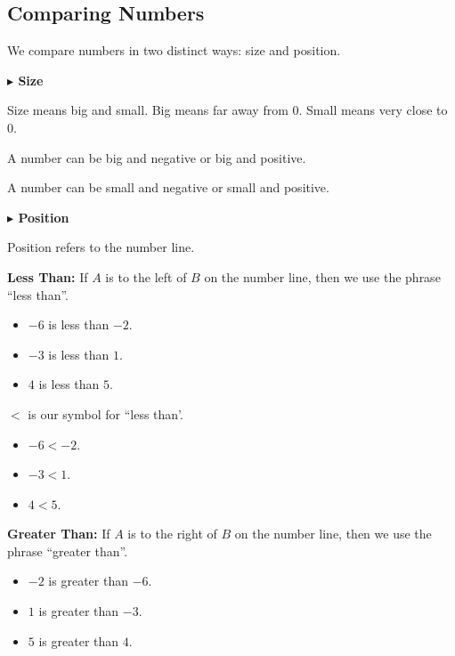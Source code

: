 \documentclass{ximera}
\begin{document}
\subsection*{Comparing Numbers}
\hfill\break


We compare numbers in two distinct ways: size and position.


\textbf{\textcolor{blue!55!black}{$\blacktriangleright$ Size}} 


Size means big and small.  Big means far away from $0$.  Small means very close to $0$.


A number can be big and negative or big and positive. 


A number can be small and negative or small and positive. 

\hfill\break


\textbf{\textcolor{blue!55!black}{$\blacktriangleright$ Position}} 


Position refers to the number line.




\textbf{Less Than:} If $A$ is to the left of $B$ on the number line, then we use the phrase ``less than''. 


\begin{itemize}
\item $-6$ is less than $-2$.
\item $-3$ is less than $1$.
\item $4$ is less than $5$.
\end{itemize}


$<$ is our symbol for ``less than'.



\begin{itemize}
\item $-6 < -2$.
\item $-3 < 1$.
\item $4 < 5$.
\end{itemize}









\textbf{Greater Than:} If $A$ is to the right of $B$ on the number line, then we use the phrase ``greater than''. 


\begin{itemize}
\item $-2$ is greater than $-6$.
\item $1$ is greater than $-3$.
\item $5$ is greater than $4$.
\end{itemize}
\end{document}
